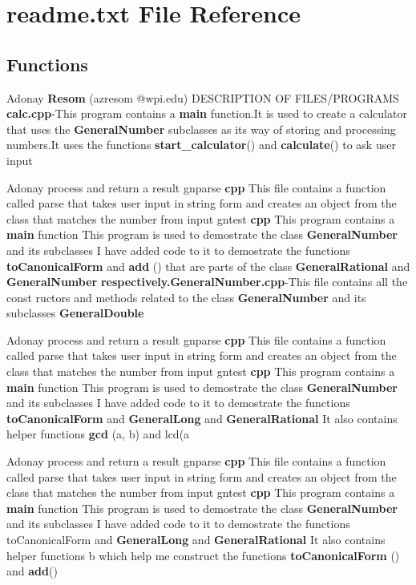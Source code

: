 \section{readme.\+txt File Reference}
\label{readme_8txt}
\subsection*{Functions}
\begin{DoxyCompactItemize}
\item 
Adonay {\bf Resom} (azresom @wpi.\+edu) D\+E\+S\+C\+R\+I\+P\+T\+I\+ON OF F\+I\+L\+ES/P\+R\+O\+G\+R\+A\+MS {\bf calc.\+cpp}-\/This program contains a {\bf main} function.\+It is used to create a calculator that uses the {\bf General\+Number} subclasses as its way of storing and processing numbers.\+It uses the functions {\bf start\+\_\+calculator}() and {\bf calculate}() to ask user input
\item 
Adonay process and return a result gnparse {\bf cpp} This file contains a function called parse that takes user input in string form and creates an object from the class that matches the number from input gntest {\bf cpp} This program contains a {\bf main} function This program is used to demostrate the class {\bf General\+Number} and its subclasses I have added code to it to demostrate the functions {\bf to\+Canonical\+Form} and {\bf add} () that are parts of the class {\bf General\+Rational} and {\bf General\+Number} {\bf respectively.\+General\+Number.\+cpp}-\/This file contains all the const ructors and methods related to the class {\bf General\+Number} and its subclasses {\bf General\+Double}
\item 
Adonay process and return a result gnparse {\bf cpp} This file contains a function called parse that takes user input in string form and creates an object from the class that matches the number from input gntest {\bf cpp} This program contains a {\bf main} function This program is used to demostrate the class {\bf General\+Number} and its subclasses I have added code to it to demostrate the functions {\bf to\+Canonical\+Form} and {\bf General\+Long} and {\bf General\+Rational} It also contains helper functions {\bf gcd} (a, b) and lcd(a
\item 
Adonay process and return a result gnparse {\bf cpp} This file contains a function called parse that takes user input in string form and creates an object from the class that matches the number from input gntest {\bf cpp} This program contains a {\bf main} function This program is used to demostrate the class {\bf General\+Number} and its subclasses I have added code to it to demostrate the functions to\+Canonical\+Form and {\bf General\+Long} and {\bf General\+Rational} It also contains helper functions b which help me construct the functions {\bf to\+Canonical\+Form} () and {\bf add}()

\end{DoxyCompactItemize}

